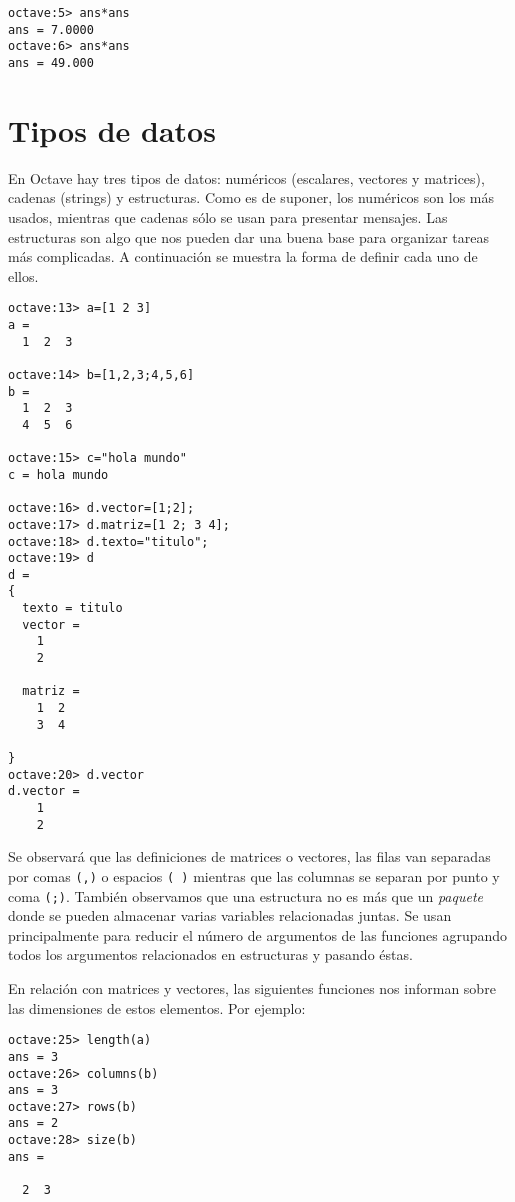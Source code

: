 \begin{verbatim}
octave:5> ans*ans
ans = 7.0000
octave:6> ans*ans
ans = 49.000
\end{verbatim}

\section{Tipos de  datos}   En Octave hay
tres  tipos  de datos:  numéricos  (escalares,  vectores y  matrices),
cadenas (strings) y estructuras. Como es de suponer, los numéricos son
los  más usados,  mientras que  cadenas  sólo se  usan para  presentar
mensajes. Las estructuras  son algo que nos pueden dar  una buena base
para organizar  tareas más complicadas.  A continuación se  muestra la
forma de definir cada uno de ellos.

\begin{verbatim}
octave:13> a=[1 2 3]
a =
  1  2  3

octave:14> b=[1,2,3;4,5,6]
b =
  1  2  3
  4  5  6

octave:15> c="hola mundo"
c = hola mundo

octave:16> d.vector=[1;2];
octave:17> d.matriz=[1 2; 3 4];
octave:18> d.texto="titulo";
octave:19> d
d =
{
  texto = titulo
  vector =
    1
    2

  matriz =
    1  2
    3  4

}
octave:20> d.vector
d.vector =
    1
    2
\end{verbatim}

Se observará  que las definiciones  de matrices o vectores,  las filas
van  separadas por  comas \verb|(,)|  o espacios  \verb|( )|  mientras
que  las columnas  se separan  por  punto y  coma \verb|(;)|.  También
observamos que  una estructura no  es más  que un {\em  paquete} donde
se  pueden almacenar  varias  variables relacionadas  juntas. Se  usan
principalmente para reducir  el número de argumentos  de las funciones
agrupando todos  los argumentos relacionados en  estructuras y pasando
éstas.

En  relación con  matrices y  vectores, las  siguientes funciones  nos
informan sobre las dimensiones de estos elementos. Por ejemplo:

\begin{verbatim}
octave:25> length(a)
ans = 3
octave:26> columns(b)
ans = 3
octave:27> rows(b)
ans = 2
octave:28> size(b)
ans =

  2  3
\end{verbatim}

